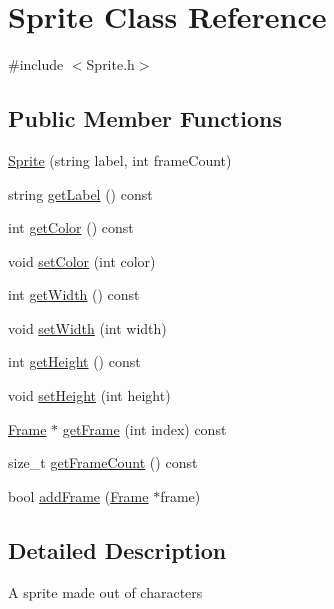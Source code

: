 \hypertarget{class_sprite}{\section{Sprite Class Reference}
\label{class_sprite}
}


{\ttfamily \#include $<$Sprite.\+h$>$}

\subsection*{Public Member Functions}
\begin{DoxyCompactItemize}
\item 
\hyperlink{class_sprite_a613e3ce159a3a9c74a3b3ad4f94d503c}{Sprite} (string label, int frame\+Count)
\item 
string \hyperlink{class_sprite_a814ee6ee24dfefdaaa203f45c18983df}{get\+Label} () const 
\item 
int \hyperlink{class_sprite_ab9e792dcb7560a6d1af2e102bee229d6}{get\+Color} () const 
\item 
void \hyperlink{class_sprite_aa5d55e89c7e2e44122faf464987fd7a4}{set\+Color} (int color)
\item 
int \hyperlink{class_sprite_a0d3e7e4fc3123fde8bba195061c66732}{get\+Width} () const 
\item 
void \hyperlink{class_sprite_abe146a7be9978735c74b6057326e5b83}{set\+Width} (int width)
\item 
int \hyperlink{class_sprite_a526cf9f08dd1b9e39b695f224efa462f}{get\+Height} () const 
\item 
void \hyperlink{class_sprite_ac94ab494261f9e6fdb725476c8e7bf99}{set\+Height} (int height)
\item 
\hyperlink{class_frame}{Frame} $\ast$ \hyperlink{class_sprite_a37dff103a01f4820a199111039349481}{get\+Frame} (int index) const 
\item 
size\+\_\+t \hyperlink{class_sprite_a6c3c7f9caa3410f79d4711e197a159e5}{get\+Frame\+Count} () const 
\item 
bool \hyperlink{class_sprite_aa7afadb031e0c14cbd42863e445f2f9d}{add\+Frame} (\hyperlink{class_frame}{Frame} $\ast$frame)
\end{DoxyCompactItemize}


\subsection{Detailed Description}
A sprite made out of characters 


